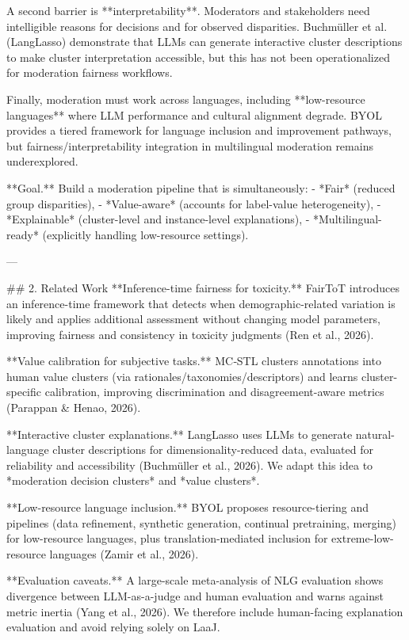 A second barrier is **interpretability**. Moderators and stakeholders need intelligible reasons for decisions and for observed disparities. Buchmüller et al. (LangLasso) demonstrate that LLMs can generate interactive cluster descriptions to make cluster interpretation accessible, but this has not been operationalized for moderation fairness workflows.

Finally, moderation must work across languages, including **low-resource languages** where LLM performance and cultural alignment degrade. BYOL provides a tiered framework for language inclusion and improvement pathways, but fairness/interpretability integration in multilingual moderation remains underexplored.

**Goal.** Build a moderation pipeline that is simultaneously:
- *Fair* (reduced group disparities),
- *Value-aware* (accounts for label-value heterogeneity),
- *Explainable* (cluster-level and instance-level explanations),
- *Multilingual-ready* (explicitly handling low-resource settings).

---

## 2. Related Work
**Inference-time fairness for toxicity.** FairToT introduces an inference-time framework that detects when demographic-related variation is likely and applies additional assessment without changing model parameters, improving fairness and consistency in toxicity judgments (Ren et al., 2026).

**Value calibration for subjective tasks.** MC‑STL clusters annotations into human value clusters (via rationales/taxonomies/descriptors) and learns cluster-specific calibration, improving discrimination and disagreement-aware metrics (Parappan & Henao, 2026).

**Interactive cluster explanations.** LangLasso uses LLMs to generate natural-language cluster descriptions for dimensionality-reduced data, evaluated for reliability and accessibility (Buchmüller et al., 2026). We adapt this idea to *moderation decision clusters* and *value clusters*.

**Low-resource language inclusion.** BYOL proposes resource-tiering and pipelines (data refinement, synthetic generation, continual pretraining, merging) for low-resource languages, plus translation-mediated inclusion for extreme-low-resource languages (Zamir et al., 2026).

**Evaluation caveats.** A large-scale meta-analysis of NLG evaluation shows divergence between LLM-as-a-judge and human evaluation and warns against metric inertia (Yang et al., 2026). We therefore include human-facing explanation evaluation and avoid relying solely on LaaJ.

